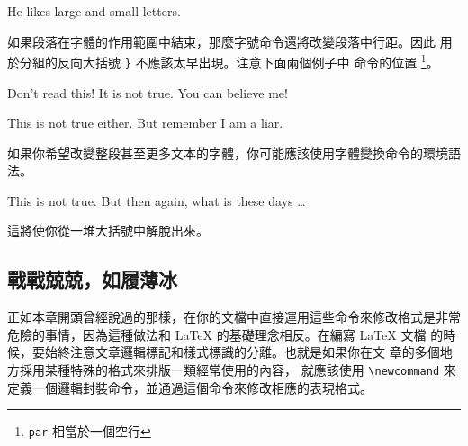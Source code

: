 \begin{example}
He likes {\LARGE large and
{\small small} letters}.
\end{example}

如果段落在字體的作用範圍中結束，那麼字號命令還將改變段落中行距。因此
用於分組的反向大括號 \verb|}| 不應該太早出現。注意下面兩個例子中
 命令的位置
\footnote{\texttt{\bs{}par} 相當於一個空行}。

\begin{example}
{\Large Don't read this!
 It is not true.
 You can believe me!\par}
\end{example}

\begin{example}
{\Large This is not true either.
But remember I am a liar.}\par
\end{example}

如果你希望改變整段甚至更多文本的字體，你可能應該使用字體變換命令的環境語法。

\begin{example}
\begin{Large}
This is not true.
But then again, what is these
days \ldots
\end{Large}
\end{example}

\noindent 這將使你從一堆大括號中解脫出來。

\subsection{戰戰兢兢，如履薄冰}

正如本章開頭曾經說過的那樣，在你的文檔中直接運用這些命令來修改格式是非常
危險的事情，因為這種做法和 \LaTeX{} 的基礎理念相反。在編寫 \LaTeX{} 文檔
的時候，要始終注意文章邏輯標記和樣式標識的分離。也就是如果你在文
章的多個地方採用某種特殊的格式來排版一類經常使用的內容，
就應該使用 \verb|\newcommand| 來定義一個邏輯封裝命令，並通過這個命令來修改相應的表現格式。

